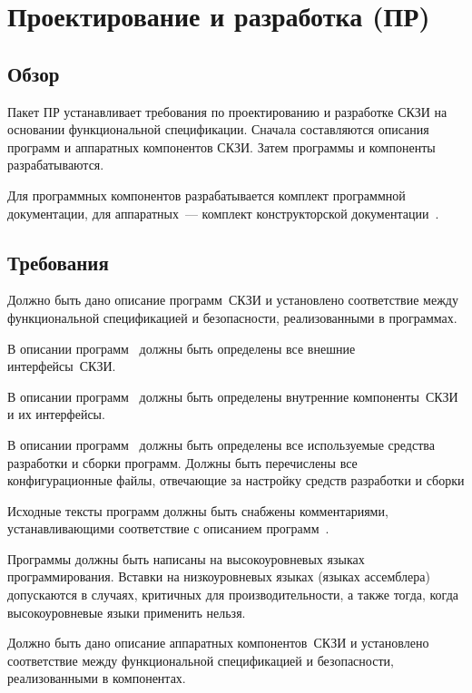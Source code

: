 \section{Проектирование и разработка (ПР)}\label{DI}

\subsection{Обзор}\label{DI.Intro}

Пакет ПР устанавливает требования по проектированию и разработке СКЗИ
на основании функциональной спецификации.
%
Сначала составляются описания программ и аппаратных компонентов СКЗИ.
Затем программы и компоненты разрабатываются.

Для программных компонентов разрабатывается комплект программной 
документации, для аппаратных~--- комплект конструкторской 
документации~.

\subsection{Требования}\label{DI.Reqs}

\label{R.DI.ProgSpec}
Должно быть дано описание программ~СКЗИ и установлено соответствие 
между функциональной спецификацией и  безопасности,
реализованными в программах.


\label{R.DI.HLD}
В описании программ~
должны быть определены все внешние интерфейсы~СКЗИ.

\label{R.DI.LLD}
В описании программ~
должны быть определены внутренние компоненты~СКЗИ и их интерфейсы.

\label{R.DI.Tools}
В описании программ~ должны быть определены все
используемые средства разработки и сборки программ. Должны быть перечислены 
все конфигурационные файлы, отвечающие за настройку средств разработки и 
сборки

\label{R.DI.Comments}
Исходные тексты программ должны быть снабжены комментариями,
устанавливающими соответствие с описанием программ~.

\label{R.DI.Language}
Программы должны быть написаны на высокоуровневых языках программирования.
Вставки на низкоуровневых языках (языках ассемблера) допускаются в случаях,
критичных для производительности, а также тогда, когда высокоуровневые языки
применить нельзя.

\label{R.DI.HardSpec}
Должно быть дано описание аппаратных компонентов~СКЗИ и установлено соответствие
между функциональной спецификацией и  безопасности,
реализованными в компонентах.

